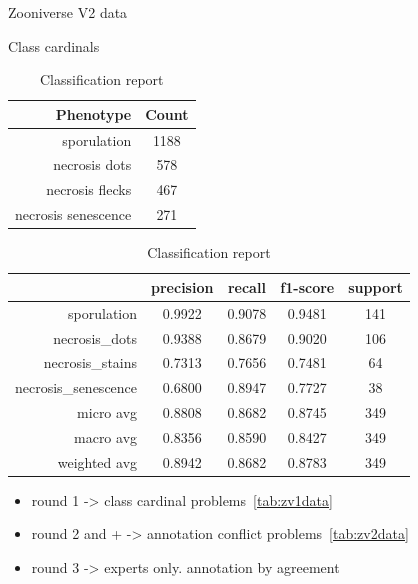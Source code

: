 \documentclass[english]{article}
\begin{document}
\begin{table}[H]
	\caption{Zooniverse V2 data}\label{tab:zv2data}
	\begin{minipage}{0.4\linewidth}
		\centering
		\caption{Class cardinals}\label{tab:zoonv2classcardinals}
		\begin{tabular}{rc}
			\toprule
			Phenotype           & Count \\
			\midrule
			sporulation         & 1188  \\
			necrosis dots       & 578   \\
			necrosis flecks     & 467   \\
			necrosis senescence & 271   \\
			\bottomrule
		\end{tabular}
	\end{minipage}%
	\begin{minipage}{0.4\linewidth}
		\centering
		\caption{Classification report}\label{tab:zv2mcr}
		\begin{tabular}{rcccc}
			\toprule
			{}                   & precision & recall & f1-score & support \\
			\midrule
			sporulation           & 0.9922    & 0.9078 & 0.9481   & 141     \\
			necrosis\_dots       & 0.9388    & 0.8679 & 0.9020   & 106     \\
			necrosis\_stains     & 0.7313    & 0.7656 & 0.7481   & 64      \\
			necrosis\_senescence & 0.6800    & 0.8947 & 0.7727   & 38      \\
			micro avg            & 0.8808    & 0.8682 & 0.8745   & 349     \\
			macro avg            & 0.8356    & 0.8590 & 0.8427   & 349     \\
			weighted avg         & 0.8942    & 0.8682 & 0.8783   & 349     \\
			\bottomrule
		\end{tabular}
	\end{minipage}
\end{table}

\begin{itemize}
	\item round 1 -> class cardinal problems~\ref*{tab:zv1data}
	\item round 2 and + -> annotation conflict problems~\ref*{tab:zv2data}
	\item round 3 -> experts only. annotation by agreement
\end{itemize}
\end{document}
